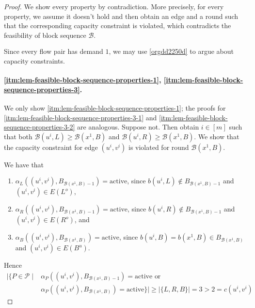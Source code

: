 \documentclass[fontsize=11pt,paper=a4]{book}
\begin{document}
\begin{proof}
We show every property by contradiction.
More precisely, for every property, we assume it doesn't hold and then obtain an edge and a round such that the corresponding capacity constraint is violated, which contradicts the feasibility of block sequence \(\mathcal{B}\).

Since every flow pair has demand \(1\), we may use \ref{orgdd2250d} to argue about capacity constraints.

\paragraph{\ref{itm:lem-feasible-block-sequence-properties-1}, \ref{itm:lem-feasible-block-sequence-properties-3}.}
We only show \ref{itm:lem-feasible-block-sequence-properties-1}; the proofs for \ref{itm:lem-feasible-block-sequence-properties-3-1} and \ref{itm:lem-feasible-block-sequence-properties-3-2} are analogous.
Suppose not.
Then obtain \(i\in[m]\) such that both \(\mathcal{B}(u^i,L)\geq\mathcal{B}(x^1,B)\) and \(\mathcal{B}(u^i,R)\geq\mathcal{B}(x^1,B)\).
We show that the capacity constraint for edge \((u^i,v^i)\) is violated for round \(\mathcal{B}(x^1,B)\).

We have that

\begin{enumerate}
\item \(\alpha_L((u^i,v^i),B_{\mathcal{B}(x^1,B)-1})=\mathrm{active}\), since \(b(u^i,L)\notin B_{\mathcal{B}(x^1,B)-1}\) and \((u^i,v^i)\in E(L^o)\),

\item \(\alpha_R((u^i,v^i),B_{\mathcal{B}(x^1,B)-1})=\mathrm{active}\), since \(b(u^i,R)\notin B_{\mathcal{B}(x^1,B)-1}\) and \((u^i,v^i)\in E(R^o)\), and

\item \(\alpha_B((u^i,v^i),B_{\mathcal{B}(x^1,B)})=\mathrm{active}\), since \(b(u^i,B)=b(x^1,B)\in B_{\mathcal{B}(x^1,B)}\) and \((u^i,v^i)\in E(B^u)\).
\end{enumerate}

Hence
\begin{align*}
\lvert\{P\in\mathcal{P}\mid&\alpha_P((u^i,v^i),B_{\mathcal{B}(x^1,B)-1})=\mathrm{active}\text{ or }\\
&\alpha_P((u^i,v^i),B_{\mathcal{B}(x^1,B)})=\mathrm{active}\}\rvert\geq\lvert\{L,R,B\}\rvert=3>2=c(u^i,v^i)
\end{align*}


\end{proof}
\end{document}
